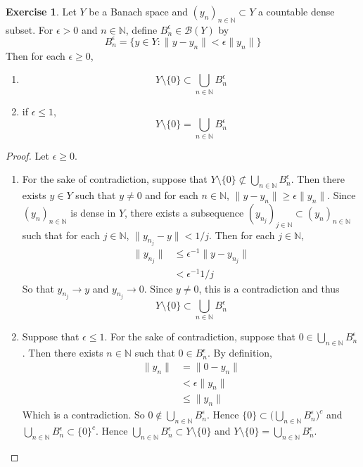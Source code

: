 \documentclass[12pt]{amsart}
\theoremstyle{definition}
\newtheorem{ex}[definition]{Exercise}
\newcommand{\ep}{\epsilon}
\newcommand{\N}{\mathbb{N}}
\newcommand{\MB}{\mathcal{B}}
\newcommand{\lex}[1]{\label{ex:#1}}
\begin{document}
	\begin{ex} \lex{00000} 
	Let $Y$ be a Banach space and $(y_n)_{n \in \N} \subset Y$ a countable dense subset. For $\ep >0$ and $n \in \N$, define $B^{\ep}_n \in \MB(Y)$ by 
	$$B^{\ep}_n = \{y \in Y: \|y - y_n\| < \ep \| y_n \| \}$$ 
	Then for each $\ep \geq 0$, 
	\begin{enumerate}
		\item $$Y \setminus \{ 0 \} \subset \bigcup\limits_{n \in \N}B^{\ep}_n$$
		\item if $\ep \leq 1$, $$Y \setminus \{ 0 \} = \bigcup\limits_{n \in \N}B^{\ep}_n$$
	\end{enumerate}
	\end{ex}	
	
	\begin{proof}
	Let $\ep \geq 0$. 
	\begin{enumerate}
		\item For the sake of contradiction, suppose that $Y\setminus \{ 0 \} \not \subset \bigcup\limits_{n \in \N}B^{\ep}_n$. Then there exists $y \in Y$ such that $y \neq 0$ and for each $n \in \N$, $\|y- y_n\| \geq \ep \|y_n\|$. Since $(y_n)_{n \in \N}$ is dense in $Y$, there exists a subsequence $(y_{n_j})_{j \in \N} \subset (y_n)_{n \in \N}$ such that for each $j \in \N$, $\|y_{n_j} - y\| < 1/j$. Then for each $j \in \N$,
		\begin{align*}
			\|y_{n_j}\| 
			& \leq  \ep^{-1}\|y- y_{n_j}\| \\
			& < \ep^{-1}1/j
		\end{align*}
		So that $y_{n_j} \rightarrow y$ and $y_{n_j} \rightarrow 0$. Since $y \neq 0$, this is a contradiction and thus $$Y \setminus \{ 0 \} \subset \bigcup\limits_{n \in \N}B^{\ep}_n$$ 
		\item Suppose that $\ep \leq 1$. For the sake of contradiction, suppose that $0 \in \bigcup\limits_{n \in \N}B^{\ep}_n $. Then there exists $n \in \N$ such that $0 \in B^{\ep}_n$.  By definition, 
		\begin{align*}
			\|y_n\| 
			& = \|0 - y_n\| \\
			& < \ep \|y_n\| \\
			& \leq \|y_n\|
		\end{align*}
		Which is a contradiction. So $0 \not \in  \bigcup\limits_{n \in \N}B^{\ep}_n$. Hence $\{0\} \subset \bigg( \bigcup\limits_{n \in \N}B^{\ep}_n \bigg)^c$ and $ \bigcup\limits_{n \in \N}B^{\ep}_n \subset \{0\}^c$. Hence $ \bigcup\limits_{n \in \N}B^{\ep}_n \subset Y \setminus \{0\}$ and $Y \setminus \{ 0 \} = \bigcup\limits_{n \in \N}B^{\ep}_n$.
	\end{enumerate}
	\end{proof}
\end{document}
